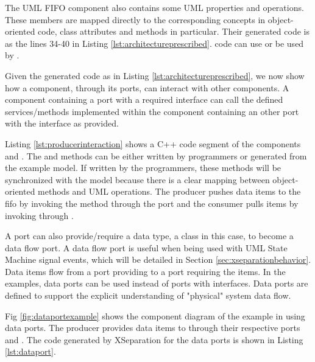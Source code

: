 The UML FIFO component also contains some UML properties and operations.
These members are mapped directly to the corresponding concepts in object-oriented code, class attributes and methods in particular.
Their generated code is  as the lines 34-40 in Listing \ref{lst:architectureprescribed}.
 code can use or be used by .

\vskip 0.1cm
 Given the generated code as in Listing \ref{lst:architectureprescribed}, we now show how a component, through its ports, can interact with other components.
A component containing a port with a required interface can call the defined services/methods implemented within the component containing an other port with the interface as provided.

Listing \ref{lst:producerinteraction} shows a C++ code segment of the components  and .
The  and  methods can be either written by programmers or generated from the example model.
If written by the programmers, these methods will be synchronized with the model because there is a clear mapping between object-oriented methods and UML operations.
The producer pushes data items to the fifo by invoking the  method through the  port and the consumer pulls items by invoking  through .

\begin{minipage}{0.95\columnwidth}
	
\end{minipage}
 
\vskip 0.1cm
A port can also provide/require a data type, a class in this case, to become a data flow port.
A data flow port is useful when being used with UML State Machine signal events, which will be detailed in Section \ref{sec:xseparationbehavior}.
Data items flow from a port providing to a port requiring the items.
In the examples, data ports can be used instead of ports with interfaces.
Data ports are defined to support the explicit understanding of "physical" system data flow. 

Fig \ref{fig:dataportexample} shows the component diagram of the example in using data ports.
The  producer provides data items to  through their respective ports  and .
The code generated by XSeparation for the data ports is shown in Listing \ref{lst:dataport}.

